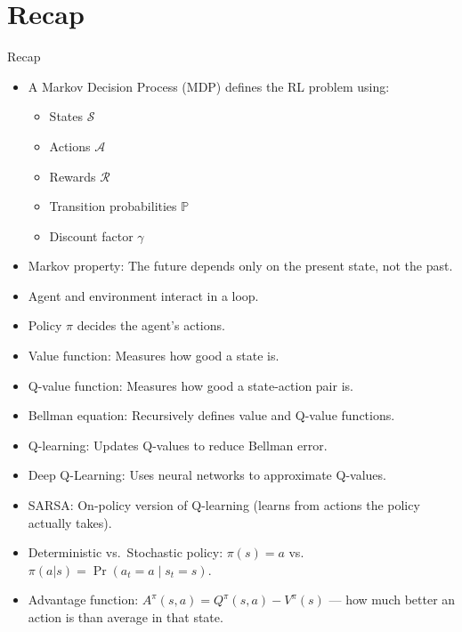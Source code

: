 \section{Recap}
\begin{frame}[allowframebreaks]{Recap}
    \begin{itemize}
        \setlength{\itemsep}{1em}
        \item A Markov Decision Process (MDP) defines the RL problem using:
        \begin{itemize}
            \item States $\mathcal{S}$
            \item Actions $\mathcal{A}$
            \item Rewards $\mathcal{R}$
            \item Transition probabilities $\mathbb{P}$
            \item Discount factor $\gamma$
        \end{itemize}
        \item Markov property: The future depends only on the present state, not the past.
        \item Agent and environment interact in a loop.
        \item Policy $\pi$ decides the agent's actions.
        \item Value function: Measures how good a state is.
        \item Q-value function: Measures how good a state-action pair is.
        \item Bellman equation: Recursively defines value and Q-value functions.
        \item Q-learning: Updates Q-values to reduce Bellman error.
        \item Deep Q-Learning: Uses neural networks to approximate Q-values.
        \item SARSA: On-policy version of Q-learning (learns from actions the policy actually takes).
        \item Deterministic vs.\ Stochastic policy: $\pi(s) = a$ vs.\ $\pi(a|s) = \Pr(a_t = a \mid s_t = s)$.
        \item Advantage function: $A^{\pi}(s,a) = Q^{\pi}(s,a) - V^{\pi}(s)$ — how much better an action is than average in that state.
    \end{itemize}
\end{frame}